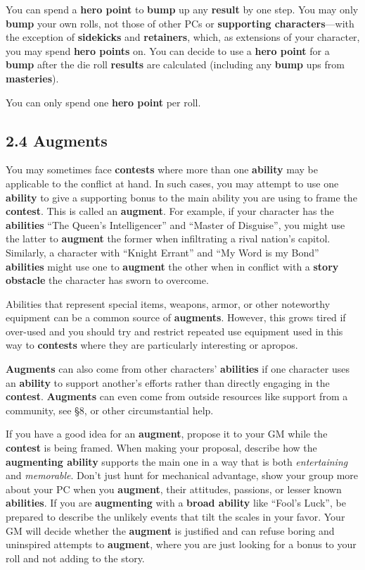 \documentclass[
]{article}
\begin{document}
You can spend a \textbf{hero point} to \textbf{bump} up any
\textbf{result} by one step. You may only \textbf{bump} your own rolls,
not those of other PCs or \textbf{supporting characters}---with the
exception of \textbf{sidekicks} and \textbf{retainers}, which, as
extensions of your character, you may spend \textbf{hero points} on. You
can decide to use a \textbf{hero point} for a \textbf{bump} after the
die roll \textbf{results} are calculated (including any \textbf{bump}
ups from \textbf{masteries}).

You can only spend one \textbf{hero point} per roll.

\hypertarget{augments}{%
\subsection{2.4 Augments}\label{augments}}

You may sometimes face \textbf{contests} where more than one
\textbf{ability} may be applicable to the conflict at hand. In such
cases, you may attempt to use one \textbf{ability} to give a supporting
bonus to the main ability you are using to frame the \textbf{contest}.
This is called an \textbf{augment}. For example, if your character has
the \textbf{abilities} ``The Queen's Intelligencer'' and ``Master of
Disguise'', you might use the latter to \textbf{augment} the former when
infiltrating a rival nation's capitol. Similarly, a character with
``Knight Errant'' and ``My Word is my Bond'' \textbf{abilities} might
use one to \textbf{augment} the other when in conflict with a
\textbf{story obstacle} the character has sworn to overcome.

Abilities that represent special items, weapons, armor, or other
noteworthy equipment can be a common source of \textbf{augments}.
However, this grows tired if over-used and you should try and restrict
repeated use equipment used in this way to \textbf{contests} where they
are particularly interesting or apropos.

\textbf{Augments} can also come from other characters'
\textbf{abilities} if one character uses an \textbf{ability} to support
another's efforts rather than directly engaging in the \textbf{contest}.
\textbf{Augments} can even come from outside resources like support from
a community, see §8, or other circumstantial help.

If you have a good idea for an \textbf{augment}, propose it to your GM
while the \textbf{contest} is being framed. When making your proposal,
describe how the \textbf{augmenting ability} supports the main one in a
way that is both \emph{entertaining} and \emph{memorable}. Don't just
hunt for mechanical advantage, show your group more about your PC when
you \textbf{augment}, their attitudes, passions, or lesser known
\textbf{abilities}. If you are \textbf{augmenting} with a \textbf{broad
ability} like ``Fool's Luck'', be prepared to describe the unlikely
events that tilt the scales in your favor. Your GM will decide whether
the \textbf{augment} is justified and can refuse boring and uninspired
attempts to \textbf{augment}, where you are just looking for a bonus to
your roll and not adding to the story.
\end{document}
